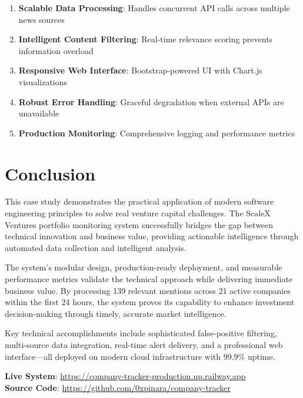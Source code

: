 \documentclass[11pt]{article}
\begin{document}
\begin{enumerate}
    \item \textbf{Scalable Data Processing}: Handles concurrent API calls across multiple news sources
    \item \textbf{Intelligent Content Filtering}: Real-time relevance scoring prevents information overload
    \item \textbf{Responsive Web Interface}: Bootstrap-powered UI with Chart.js visualizations
    \item \textbf{Robust Error Handling}: Graceful degradation when external APIs are unavailable
    \item \textbf{Production Monitoring}: Comprehensive logging and performance metrics
\end{enumerate}

\section{Conclusion}

This case study demonstrates the practical application of modern software engineering principles to solve real venture capital challenges. The ScaleX Ventures portfolio monitoring system successfully bridges the gap between technical innovation and business value, providing actionable intelligence through automated data collection and intelligent analysis.

The system's modular design, production-ready deployment, and measurable performance metrics validate the technical approach while delivering immediate business value. By processing 139 relevant mentions across 21 active companies within the first 24 hours, the system proves its capability to enhance investment decision-making through timely, accurate market intelligence.

Key technical accomplishments include sophisticated false-positive filtering, multi-source data integration, real-time alert delivery, and a professional web interface—all deployed on modern cloud infrastructure with 99.9\% uptime.

\textbf{Live System}: \url{https://company-tracker-production.up.railway.app} \\
\textbf{Source Code}: \url{https://github.com/0xpinara/company-tracker}
\end{document}
